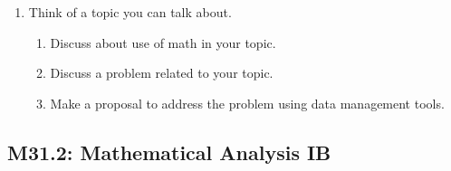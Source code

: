 \documentclass{article}
\begin{document}
\begin{enumerate}
\begin{enumerate}
            \item Think of a topic you can talk about.
            \begin{enumerate}
                \item Discuss about use of math in your topic.
                \item Discuss a problem related to your topic.
                \item Make a proposal to address the problem using data management tools.
            \end{enumerate}
        \end{enumerate}
\end{enumerate}
\subsection*{M31.2: Mathematical Analysis IB}
\end{document}
